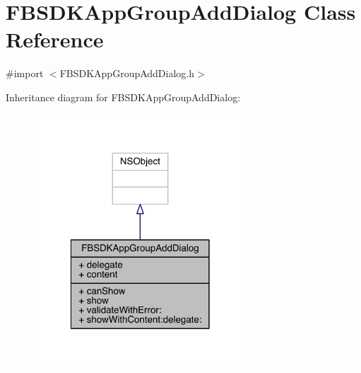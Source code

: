 \hypertarget{interface_f_b_s_d_k_app_group_add_dialog}{\section{F\-B\-S\-D\-K\-App\-Group\-Add\-Dialog Class Reference}
\label{interface_f_b_s_d_k_app_group_add_dialog}
}


{\ttfamily \#import $<$F\-B\-S\-D\-K\-App\-Group\-Add\-Dialog.\-h$>$}



Inheritance diagram for F\-B\-S\-D\-K\-App\-Group\-Add\-Dialog\-:
\nopagebreak
\begin{figure}[H]
\begin{center}
\leavevmode
\includegraphics[width=226pt]{interface_f_b_s_d_k_app_group_add_dialog__inherit__graph}
\end{center}
\end{figure}


